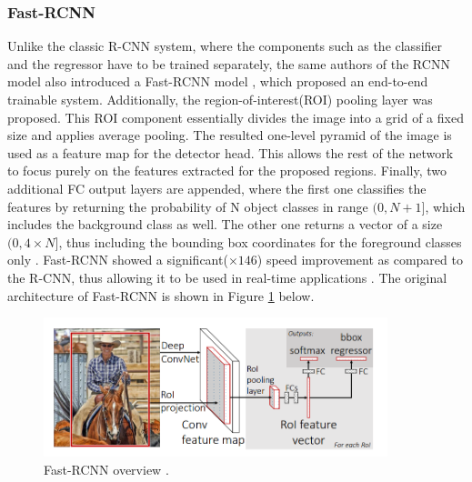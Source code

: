 \subsubsection{Fast-RCNN}
Unlike the classic R-CNN system, where the components such as the classifier and the regressor have to be trained separately, the same authors of the RCNN  model also introduced a Fast-RCNN model \cite{Girshick2015}, which proposed an end-to-end trainable system. Additionally, the region-of-interest(ROI) pooling layer was proposed. This ROI component essentially divides the image into a grid of a fixed size and applies average pooling. The resulted one-level pyramid of the image is used as a feature map for the detector head. This allows the rest of the network to focus purely on the features extracted for the proposed regions. Finally, two additional FC output layers are appended, where the first one classifies the features by returning the probability of N object classes in range $(0, N+1]$, which includes the background class as well. The other one returns a vector of a size $(0, 4\times N]$, thus including the bounding box coordinates for the foreground classes only \cite{Girshick2015}. Fast-RCNN showed a significant($\times 146$) speed improvement as compared to the R-CNN, thus allowing it to be used in real-time applications \cite{Girshick2013}. The original architecture of Fast-RCNN is shown in Figure \ref{fast_rcnn} below. 

\begin{figure}[htb]
	\begin{center}
		\includegraphics[width=10cm]{./fast_rcnn.png}
	\end{center}
	\caption{Fast-RCNN overview \cite{Girshick2015}.}\label{fast_rcnn}
	\begin{center}
	\end{center}
\end{figure}
\FloatBarrier

